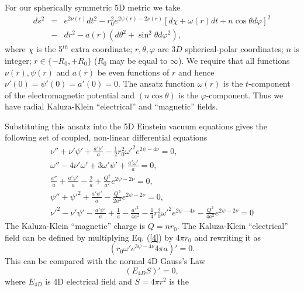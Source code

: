 For our spherically symmetric 5D metric we take 
\begin{eqnarray} 
ds^2 &=& e^{2\nu (r)}dt^{2} - r_0^2e^{2\psi (r) - 2\nu (r)}
\left [d\chi +  \omega (r)dt + n\cos \theta d\varphi \right ]^2  
\nonumber \\
&-& dr^{2} - a(r)(d\theta ^{2} + 
\sin ^{2}\theta  d\varphi ^2),
\label{1}
\end{eqnarray}
where $\chi $ is the 5$^{th}$ extra coordinate; 
$r,\theta ,\varphi$ are $3D$  spherical-polar coordinates; 
$n$ is integer; $r \in \{ -R_0 , +R_0 \}$ 
($R_0$ may be equal to $\infty$). We require that all 
functions $\nu (r), \psi(r)$ and $a(r)$ be even 
functions of $r$ and hence  $\nu'(0)=\psi'(0)=a'(0)=0$.
The ansatz function $\omega (r)$ is the $t$-component of the electromagnetic
potential and $(n\cos\theta)$ is the $\varphi$-component. 
Thus we have radial Kaluza-Klein ``electrical'' and ``magnetic'' fields. 
\par 
Substituting this ansatz into the 5D Einstein vacuum equations 
gives \cite{dzhds} the following set of coupled, non-linear
differential equations
\begin{eqnarray} 
\nu '' + \nu'\psi' + \frac{a'\nu'}{a} - 
\frac{1}{2} r_0^2 \omega '^2e^{2\psi - 4\nu} = 0,
\label{3}\\
\omega '' - 4\nu'\omega' + 3\omega '\psi ' + 
\frac{a'\omega '}{a} = 0, 
\label{4}\\ 
\frac{a''}{a} + \frac{a'\psi '}{a} - \frac{2}{a} + 
\frac{Q^2}{a^2}e^{2\psi - 2\nu} = 0, 
\label{5}\\ 
\psi '' + {\psi '}^2 + \frac{a'\psi '}{a} - 
\frac{Q^2}{2a^2}e^{2\psi - 2\nu} = 0, 
\label{6}\\ 
\nu '^2 - \nu '\psi ' - \frac{a'\psi '}{a} + 
\frac{1}{a} - \frac{a'^2}{4a^2} - 
\frac{1}{4}r_0^2\omega '^2 e^{2\psi - 4\nu} - 
\frac{Q^2}{4a^2} e^{2\psi - 2\nu} = 0 
\label{7} 
\end{eqnarray} 
The Kaluza-Klein ``magnetic'' charge is $Q = nr_0$.
The Kaluza-Klein ``electrical'' field can be defined
by multiplying Eq. (\ref{4}) by $4 \pi r_0$ 
and rewriting it as
\begin{equation} 
\left( r_0 \omega ' e^{3\psi - 4\nu} 4 \pi a \right)' = 0.
\label{7a} 
\end{equation} 
This can be compared with the normal 4D Gauss's Law 
\begin{equation} 
\left ( E_{4D} S\right )' = 0,
\label{7b}
\end{equation} 
where $E_{4D}$ is 4D electrical field and $S = 4 \pi r^2$ is the 

